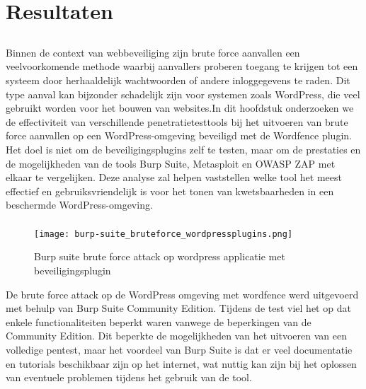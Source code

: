 
\chapter{Resultaten}%
\label{ch:resultaten}

\section{}
Binnen de context van webbeveiliging zijn brute force aanvallen een veelvoorkomende methode waarbij aanvallers proberen toegang te krijgen tot een systeem 
door herhaaldelijk wachtwoorden of andere inloggegevens te raden. Dit type aanval kan bijzonder schadelijk zijn voor systemen zoals WordPress, die veel 
gebruikt worden voor het bouwen van websites.In dit hoofdstuk onderzoeken we de effectiviteit van verschillende penetratietesttools bij het uitvoeren van 
brute force aanvallen op een WordPress-omgeving beveiligd met de Wordfence plugin. Het doel is niet om de beveiligingsplugins zelf te testen, maar om de 
prestaties en de mogelijkheden van de tools Burp Suite, Metasploit en OWASP ZAP met elkaar te vergelijken. Deze analyse zal helpen vaststellen welke tool 
het meest effectief en gebruiksvriendelijk is voor het tonen van kwetsbaarheden in een beschermde WordPress-omgeving.

\subsection{}
\begin{figure}
    \centering
    \texttt{[image: burp-suite\_bruteforce\_wordpressplugins.png]}
    \caption[Burp suite brute force attack op wordpress applicatie met beveiligingsplugin]{Burp suite brute force attack op wordpress applicatie met beveiligingsplugin}
\end{figure}
De brute force attack op de WordPress omgeving met wordfence werd uitgevoerd met behulp van Burp Suite Community Edition. Tijdens de test viel het 
op dat enkele functionaliteiten beperkt waren vanwege de beperkingen van de Community Edition. Dit beperkte de mogelijkheden van het uitvoeren van een volledige 
pentest, maar het voordeel van Burp Suite is dat er veel documentatie en tutorials beschikbaar zijn op het internet, wat nuttig kan zijn bij het oplossen van 
eventuele problemen tijdens het gebruik van de tool.

